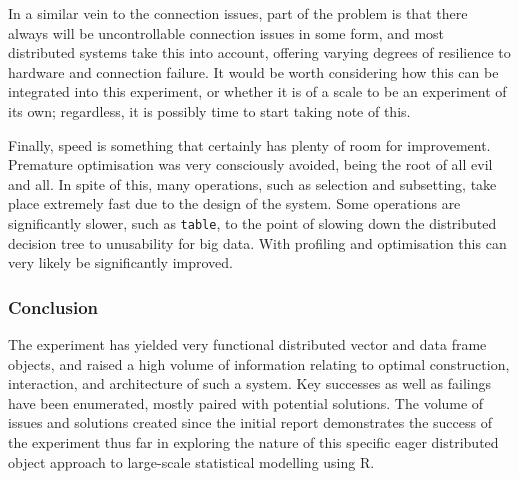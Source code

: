 In a similar vein to the connection issues, part of the problem is that
there always will be uncontrollable connection issues in some form, and
most distributed systems take this into account, offering varying
degrees of resilience to hardware and connection failure. It would be
worth considering how this can be integrated into this experiment, or
whether it is of a scale to be an experiment of its own; regardless, it
is possibly time to start taking note of this.

Finally, speed is something that certainly has plenty of room for
improvement. Premature optimisation was very consciously avoided, being
the root of all evil and all. In spite of this, many operations, such as
selection and subsetting, take place extremely fast due to the design of
the system. Some operations are significantly slower, such as
\texttt{table}, to the point of slowing down the distributed decision
tree to unusability for big data. With profiling and optimisation this
can very likely be significantly improved.

\hypertarget{conclusion}{%
\subsubsection{Conclusion}\label{conclusion}}

The experiment has yielded very functional distributed vector and data
frame objects, and raised a high volume of information relating to
optimal construction, interaction, and architecture of such a system.
Key successes as well as failings have been enumerated, mostly paired
with potential solutions. The volume of issues and solutions created
since the initial report demonstrates the success of the experiment thus
far in exploring the nature of this specific eager distributed object
approach to large-scale statistical modelling using R.